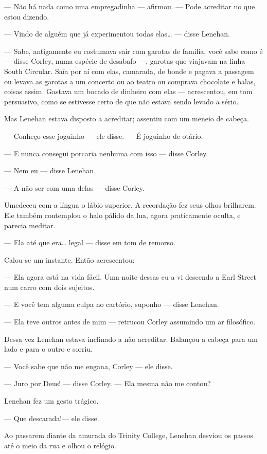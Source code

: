 --- Não há nada como uma empregadinha --- afirmou.  --- Pode acreditar no que
estou dizendo.

--- Vindo de alguém que já experimentou todas elas\ldots{} --- disse Lenehan.

--- Sabe, antigamente eu costumava sair com garotas de família, você sabe
como é --- disse Corley, numa espécie de desabafo ---, garotas que viajavam na
linha South Circular.  Saía por aí com elas, camarada, de bonde e pagava a
passagem ou levava as garotas a um concerto ou ao teatro ou comprava chocolate
e balas, coisas assim.  Gastava um bocado de dinheiro com elas --- acrescentou,
em tom persuasivo, como se estivesse certo de que não estava sendo levado a
sério.

Mas Lenehan estava disposto a acreditar; assentiu com um meneio de cabeça.

--- Conheço esse joguinho --- ele disse.  --- É joguinho de otário.

--- E nunca consegui porcaria nenhuma com isso --- disse Corley.

--- Nem eu --- disse Lenehan.

--- A não ser com uma delas --- disse Corley.

Umedeceu com a língua o lábio superior.  A recordação fez seus olhos brilharem.
Ele também contemplou o halo pálido da lua, agora praticamente oculta, e
parecia meditar.

--- Ela até que era\ldots{} legal --- disse em tom de remorso.

Calou-se um instante.  Então acrescentou:

--- Ela agora está na vida fácil.  Uma noite dessas eu a vi descendo a Earl
Street num carro com dois sujeitos.

--- E você tem alguma culpa no cartório, suponho --- disse Lenehan.

--- Ela teve outros antes de mim --- retrucou Corley assumindo um ar
filosófico.

Dessa vez Lenehan estava inclinado a não acreditar.  Balançou a cabeça para um
lado e para o outro e sorriu.

--- Você sabe que não me engana, Corley --- ele disse.

--- Juro por Deus! --- disse Corley.  --- Ela mesma não me contou?

Lenehan fez um gesto trágico.

--- Que descarada!--- ele disse.

Ao passarem diante da amurada do Trinity College, Lenehan desviou os passos até
o meio da rua e olhou o relógio.

